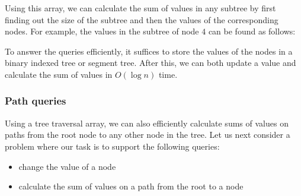 Using this array, we can calculate the sum of values
in any subtree by first finding out the size of the subtree
and then the values of the corresponding nodes.
For example, the values in the subtree of node $4$
can be found as follows:

\begin{center}
\end{center}

To answer the queries efficiently,
it suffices to store the values of the
nodes in a binary indexed tree or segment tree.
After this, we can both update a value
and calculate the sum of values in $O(\log n)$ time.

\subsubsection{Path queries}

Using a tree traversal array, we can also efficiently
calculate sums of values on
paths from the root node to any other
node in the tree.
Let us next consider a problem where our task
is to support the following queries:
\begin{itemize}
\item change the value of a node
\item calculate the sum of values on a path from
the root to a node
\end{itemize}


